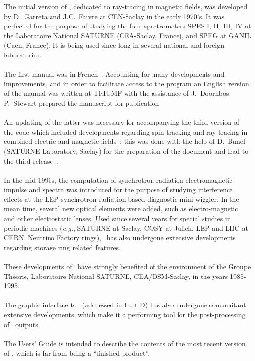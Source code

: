 The initial  version of \zgoubi, dedicated to  ray-tracing in magnetic fields,
 was developed  by D.~Garreta and J.C.~Faivre  at CEN-Saclay in the early 1970's.
 It was perfected for the purpose of studying the four spectrometers SPES I, II, III, IV  
at the  Laboratoire National SATURNE (CEA-Saclay, France), and SPEG at GANIL 
(Caen, France). It is being used since long in several national and foreign laboratories.
\\
\\
\noindent The first manual was in French~\cite{Biblio1}. %
 Accounting for  many developments and improvements, and in order to facilitate access to 
the program an English version of the manual was written at TRIUMF with the assistance of 
J.~Doornbos. P.~Stewart prepared the manuscript for publication~\cite{Biblio2}%
\\
\\
\noindent  An updating of the latter was necessary for accompanying the third version of the code which included 
 developments regarding  spin tracking and ray-tracing in combined electric and magnetic fields~; 
 this was done with the help of 
D.~Bunel (SATURNE Laboratory, Saclay) for the preparation of the document and lead to the third 
release~\cite{Biblio2b}.
\\
\\
\noindent In the mid-1990s,  the computation of synchrotron radiation electromagnetic impulse and spectra 
was introduced for the purpose of studying interference effects at the LEP 
synchrotron radiation  based diagnostic mini-wiggler. In the mean 
time, several new optical elements were added, such as 
electro-magnetic and other electrostatic lenses. Used since several years for special studies in periodic
machines (\emph{e.g.}, SATURNE at Saclay, COSY at Julich, LEP and LHC at CERN, Neutrino Factory rings),  
\zgou\  has also undergone extensive developments regarding storage ring related features.
\\
\\
\noindent These  developments of \zgou\ 
 have strongly benefited of the environment of the Groupe Th\'eorie, 
Laboratoire National SATURNE, CEA/DSM-Saclay, in the years 1985-1995. 
\\
\\
The graphic  interface to \zgou\ (addressed in Part D) has also undergone concomitant extensive  
developments, which make it a performing tool for the post-processing of \zgou\  outputs.
\\
\\
\noindent  The Users' Guide is intended  to describe the contents of the most
recent version of \zgou, which is far from being a ``finished product''.




